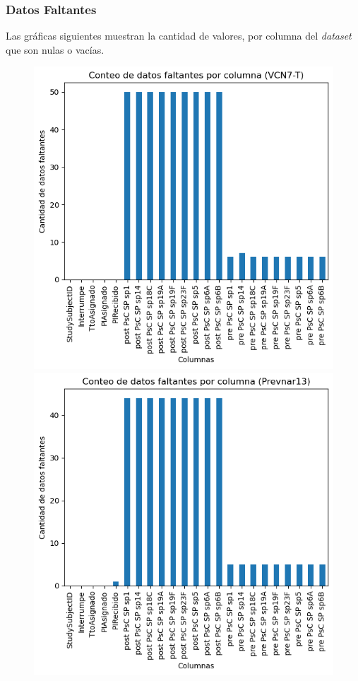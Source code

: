 \subsubsection{Datos Faltantes}
Las gráficas siguientes muestran la cantidad de valores, por columna del \textit{dataset} que son nulas o vacías. 
\begin{figure}[h]
    \centering
    \begin{minipage}{0.45\textwidth}
        \centering
        \includegraphics[width=1.0\textwidth]{Graphics/mdq.png}
        \caption{}
        \label{fig:mdq}
    \end{minipage}%
    \hfill
    \begin{minipage}{0.45\textwidth}
        \centering
        \includegraphics[width=1.0\textwidth]{Graphics/mdp.png}

\end{minipage}
\end{figure}

